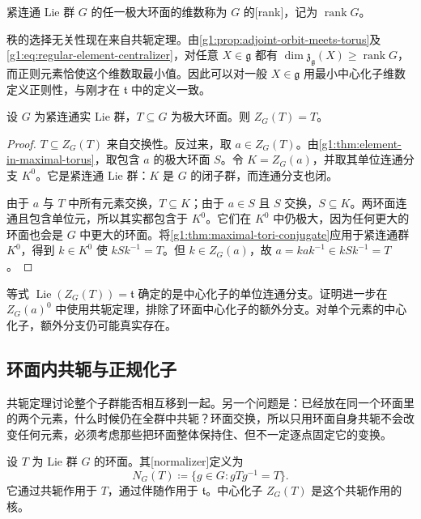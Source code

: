 \begin{definition}\label{g1:def:compact-group-rank}
	紧连通 Lie 群 \(G\) 的任一极大环面的维数称为 \(G\) 的[rank]，记为 \(\operatorname{rank}G\)。
\end{definition}

秩的选择无关性现在来自共轭定理。由\cref{g1:prop:adjoint-orbit-meets-torus}及\eqref{g1:eq:regular-element-centralizer}，对任意 \(X\in\mathfrak g\) 都有 \(\dim\mathfrak z_{\mathfrak g}(X)\ge\operatorname{rank}G\)，而正则元素恰使这个维数取最小值。因此可以对一般 \(X\in\mathfrak g\) 用最小中心化子维数定义正则性，与刚才在 \(\mathfrak t\) 中的定义一致。

\begin{proposition}\label{g1:prop:maximal-torus-centralizer}
	设 \(G\) 为紧连通实 Lie 群，\(T\subseteq G\) 为极大环面。则 \(Z_G(T)=T\)。
\end{proposition}
\begin{proof}
	\(T\subseteq Z_G(T)\) 来自交换性。反过来，取 \(a\in Z_G(T)\)。由\cref{g1:thm:element-in-maximal-torus}，取包含 \(a\) 的极大环面 \(S\)。令 \(K=Z_G(a)\)，并取其单位连通分支 \(K^0\)。它是紧连通 Lie 群：\(K\) 是 \(G\) 的闭子群，而连通分支也闭。

	由于 \(a\) 与 \(T\) 中所有元素交换，\(T\subseteq K\)；由于 \(a\in S\) 且 \(S\) 交换，\(S\subseteq K\)。两环面连通且包含单位元，所以其实都包含于 \(K^0\)。它们在 \(K^0\) 中仍极大，因为任何更大的环面也会是 \(G\) 中更大的环面。将\cref{g1:thm:maximal-tori-conjugate}应用于紧连通群 \(K^0\)，得到 \(k\in K^0\) 使 \(kSk^{-1}=T\)。但 \(k\in Z_G(a)\)，故 \(a=kak^{-1}\in kSk^{-1}=T\)。
\end{proof}

等式 \(\operatorname{Lie}(Z_G(T))=\mathfrak t\) 确定的是中心化子的单位连通分支。证明进一步在 \(Z_G(a)^0\) 中使用共轭定理，排除了环面中心化子的额外分支。对单个元素的中心化子，额外分支仍可能真实存在。

\subsection{环面内共轭与正规化子}
\label{g1:subsec:1903:04}
共轭定理讨论整个子群能否相互移到一起。另一个问题是：已经放在同一个环面里的两个元素，什么时候仍在全群中共轭？环面交换，所以只用环面自身共轭不会改变任何元素，必须考虑那些把环面整体保持住、但不一定逐点固定它的变换。

\begin{definition}\label{g1:def:torus-normalizer}
	设 \(T\) 为 Lie 群 \(G\) 的环面。其[normalizer]定义为
	\[
		N_G(T)\coloneqq\{g\in G:gTg^{-1}=T\}.
	\]
	它通过共轭作用于 \(T\)，通过伴随作用于 \(\mathfrak t\)。中心化子 \(Z_G(T)\) 是这个共轭作用的核。
\end{definition}

